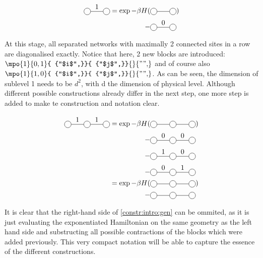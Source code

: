 \begin{equation}
    \begin{split}
        \mpob{2}{ {0,1,0}  }{}{}{}{{"",}}  = \exp -\beta H( & \mpob{2}{ {,,} }{}{}{}{{"",}})  \\
        - &\mpob{2}{ {0,0,0}  }{}{}{}{{"",}}
    \end{split}
\end{equation}

At this stage, all separated networks with maximally 2 connected sites in a row are diagonalised exactly. Notice that here, 2  new blocks are introduced: $\mpo{1}{ {0,1}  }{ {"$i$",}}{ {"$j$",}}{}{{"",}}$ and of course also $\mpo{1}{ {1,0}}{ {"$i$",}}{ {"$j$",}}{}{{"",}}$. As can be seen, the dimension of sublevel 1 needs to be $d^2$, with d the dimension of physical level. Although different possible constructions already differ in the next step, one more step is added to make te construction and notation clear.

\begin{equation}\label{constr:intro:gen}
    \begin{split}
        \mpob{3}{ {0,1,1,0}  }{}{}{}{{,,,}}  = \exp  -\beta H( &\mpob{3}{ {,,,} }{}{}{}{{,,}})  \\
        -&\mpob{3}{ {0,0,0,0}  }{}{}{}{{,,,}}\\
        -&\mpob{3}{ {0,1,0,0}  }{}{}{}{{,,,}}\\
        -&\mpob{3}{ {0,0,1,0}  }{}{}{}{{,,,}}\\
        =\exp  -\beta H( &\mpob{3}{ {,,,} }{}{}{}{{,,}})\\
        -&\mpob{3}{ {,,,}  }{}{}{}{{,,,}}\\
    \end{split}
\end{equation}

It is clear that the right-hand side of \cref{constr:intro:gen} can be ommited, as it is just evaluating the exponentiated Hamiltonian on the same geometry as the left hand side and substructing all possible contractions of the blocks which were added previously. This very compact notation will be able to capture the essence of the different constructions.
